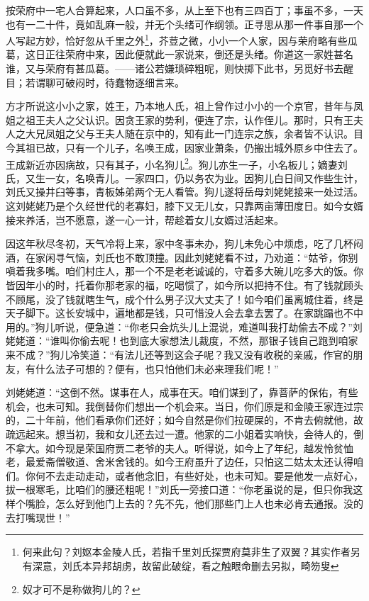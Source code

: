 \documentclass[12pt,oneside]{book}
\begin{document}
按荣府中一宅人合算起来，人口虽不多，从上至下也有三四百丁；事虽不多，一天也有一二十件，竟如乱麻一般，并无个头绪可作纲领。正寻思从那一件事自那一个人写起方妙，恰好忽从千里之外\footnote{何来此句？刘妪本金陵人氏，若指千里刘氏探贾府莫非生了双翼？其实作者另有深意，刘氏本异邦胡虏，故留此破绽，看之触眼命删去另拟，畸笏叟}，芥荳之微，小小一个人家，因与荣府略有些瓜葛，这日正往荣府中来，因此便就此一家说来，倒还是头绪。你道这一家姓甚名谁，又与荣府有甚瓜葛。——诸公若嫌琐碎粗呢，则快掷下此书，另觅好书去醒目；若谓聊可破闷时，待蠢物逐细言来。

方才所说这小小之家，姓王，乃本地人氏，祖上曾作过小小的一个京官，昔年与凤姐之祖王夫人之父认识。因贪王家的势利，便连了宗，认作侄儿。那时，只有王夫人之大兄凤姐之父与王夫人随在京中的，知有此一门连宗之族，余者皆不认识。目今其祖已故，只有一个儿子，名唤王成，因家业萧条，仍搬出城外原乡中住去了。王成新近亦因病故，只有其子，小名狗儿\footnote{奴才可不是称做狗儿的？}。狗儿亦生一子，小名板儿；嫡妻刘氏，又生一女，名唤青儿。一家四口，仍以务农为业。因狗儿白日间又作些生计，刘氏又操井臼等事，青板姊弟两个无人看管。狗儿遂将岳母刘姥姥接来一处过活。这刘姥姥乃是个久经世代的老寡妇，膝下又无儿女，只靠两亩薄田度日。如今女婿接来养活，岂不愿意，遂一心一计，帮趁着女儿女婿过活起来。

因这年秋尽冬初，天气冷将上来，家中冬事未办，狗儿未免心中烦虑，吃了几杯闷酒，在家闲寻气恼，刘氏也不敢顶撞。因此刘姥姥看不过，乃劝道：“姑爷，你别嗔着我多嘴。咱们村庄人，那一个不是老老诚诚的，守着多大碗儿吃多大的饭。你皆因年小的时，托着你那老家的福，吃喝惯了，如今所以把持不住。有了钱就顾头不顾尾，没了钱就瞎生气，成个什么男子汉大丈夫了！如今咱们虽离城住着，终是天子脚下。这长安城中，遍地都是钱，只可惜没人会去拿去罢了。在家跳蹋也不中用的。”狗儿听说，便急道：“你老只会炕头儿上混说，难道叫我打劫偷去不成？”刘姥姥道：“谁叫你偷去呢！也到底大家想法儿裁度，不然，那银子钱自己跑到咱家来不成？”狗儿冷笑道：“有法儿还等到这会子呢？我又没有收税的亲戚，作官的朋友，有什么法子可想的？便有，也只怕他们未必来理我们呢！”

刘姥姥道：“这倒不然。谋事在人，成事在天。咱们谋到了，靠菩萨的保佑，有些机会，也未可知。我倒替你们想出一个机会来。当日，你们原是和金陵王家连过宗的，二十年前，他们看承你们还好；如今自然是你们拉硬屎的，不肯去俯就他，故疏远起来。想当初，我和女儿还去过一遭。他家的二小姐着实响快，会待人的，倒不拿大。如今现是荣国府贾二老爷的夫人。听得说，如今上了年纪，越发怜贫恤老，最爱斋僧敬道、舍米舍钱的。如今王府虽升了边任，只怕这二姑太太还认得咱们。你何不去走动走动，或者他念旧，有些好处，也未可知。要是他发一点好心，拔一根寒毛，比咱们的腰还粗呢！”刘氏一旁接口道：“你老虽说的是，但只你我这样个嘴脸，怎么好到他门上去的？先不先，他们那些门上人也未必肯去通报。没的去打嘴现世！”
\end{document}
